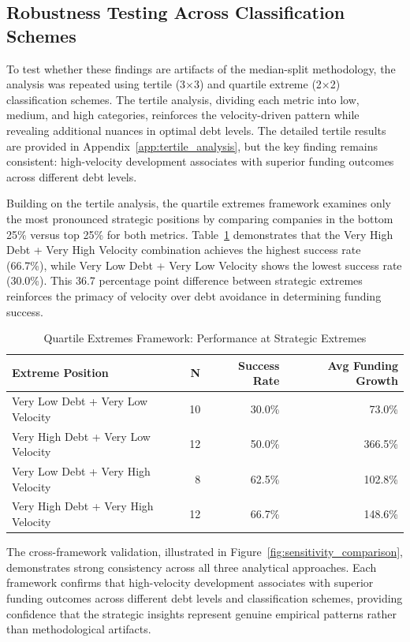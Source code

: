 \subsection{Robustness Testing Across Classification Schemes}

To test whether these findings are artifacts of the median-split methodology, the analysis was repeated using tertile (3×3) and quartile extreme (2×2) classification schemes. The tertile analysis, dividing each metric into low, medium, and high categories, reinforces the velocity-driven pattern while revealing additional nuances in optimal debt levels. The detailed tertile results are provided in Appendix~\ref{app:tertile_analysis}, but the key finding remains consistent: high-velocity development associates with superior funding outcomes across different debt levels.

Building on the tertile analysis, the quartile extremes framework examines only the most pronounced strategic positions by comparing companies in the bottom 25\% versus top 25\% for both metrics. Table~\ref{tab:quartile_extremes} demonstrates that the Very High Debt + Very High Velocity combination achieves the highest success rate (66.7\%), while Very Low Debt + Very Low Velocity shows the lowest success rate (30.0\%). This 36.7 percentage point difference between strategic extremes reinforces the primacy of velocity over debt avoidance in determining funding success.

\begin{table}[htbp]
\centering
\caption{Quartile Extremes Framework: Performance at Strategic Extremes}
\label{tab:quartile_extremes}
\begin{tabular}{lrrr}
\hline
\textbf{Extreme Position} & \textbf{N} & \textbf{Success Rate} & \textbf{Avg Funding Growth} \\
\hline
Very Low Debt + Very Low Velocity & 10 & 30.0\% & 73.0\% \\
Very High Debt + Very Low Velocity & 12 & 50.0\% & 366.5\% \\
Very Low Debt + Very High Velocity & 8 & 62.5\% & 102.8\% \\
Very High Debt + Very High Velocity & 12 & 66.7\% & 148.6\% \\
\hline
\end{tabular}
\end{table}

The cross-framework validation, illustrated in Figure~\ref{fig:sensitivity_comparison}, demonstrates strong consistency across all three analytical approaches. Each framework confirms that high-velocity development associates with superior funding outcomes across different debt levels and classification schemes, providing confidence that the strategic insights represent genuine empirical patterns rather than methodological artifacts.

